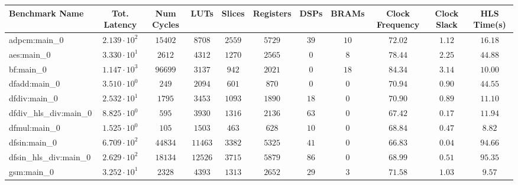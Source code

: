 \begin{tabular}{|l|c|c|c|c|c|c|c|c|c|c|}
\hline
Benchmark Name          & Tot. Latency           & Num Cycles & LUTs      & Slices    & Registers & DSPs    & BRAMs   & Clock Frequency & Clock Slack & HLS Time(s) \\
\hline
adpcm:main\_0           & $ 2.139 \cdot 10^{2} $ & $ 15402  $ & $ 8708  $ & $ 2559  $ & $ 5729  $ & $ 39  $ & $ 10  $ & $ 72.02       $ & $ 1.12    $ & $ 16.18   $ \\
aes:main\_0             & $ 3.330 \cdot 10^{1} $ & $ 2612   $ & $ 4312  $ & $ 1270  $ & $ 2565  $ & $ 0   $ & $ 8   $ & $ 78.44       $ & $ 2.25    $ & $ 44.88   $ \\
bf:main\_0              & $ 1.147 \cdot 10^{3} $ & $ 96699  $ & $ 3137  $ & $ 942   $ & $ 2021  $ & $ 0   $ & $ 18  $ & $ 84.34       $ & $ 3.14    $ & $ 10.00   $ \\
dfadd:main\_0           & $ 3.510 \cdot 10^{0} $ & $ 249    $ & $ 2094  $ & $ 601   $ & $ 870   $ & $ 0   $ & $ 0   $ & $ 70.94       $ & $ 0.90    $ & $ 44.55   $ \\
dfdiv:main\_0           & $ 2.532 \cdot 10^{1} $ & $ 1795   $ & $ 3453  $ & $ 1093  $ & $ 1890  $ & $ 18  $ & $ 0   $ & $ 70.90       $ & $ 0.89    $ & $ 11.10   $ \\
dfdiv\_hls\_div:main\_0 & $ 8.825 \cdot 10^{0} $ & $ 595    $ & $ 3930  $ & $ 1316  $ & $ 2136  $ & $ 63  $ & $ 0   $ & $ 67.42       $ & $ 0.17    $ & $ 11.94   $ \\
dfmul:main\_0           & $ 1.525 \cdot 10^{0} $ & $ 105    $ & $ 1503  $ & $ 463   $ & $ 628   $ & $ 10  $ & $ 0   $ & $ 68.84       $ & $ 0.47    $ & $ 8.82    $ \\
dfsin:main\_0           & $ 6.709 \cdot 10^{2} $ & $ 44834  $ & $ 11463 $ & $ 3382  $ & $ 5325  $ & $ 41  $ & $ 0   $ & $ 66.83       $ & $ 0.04    $ & $ 94.66   $ \\
dfsin\_hls\_div:main\_0 & $ 2.629 \cdot 10^{2} $ & $ 18134  $ & $ 12526 $ & $ 3715  $ & $ 5879  $ & $ 86  $ & $ 0   $ & $ 68.99       $ & $ 0.51    $ & $ 95.35   $ \\
gsm:main\_0             & $ 3.252 \cdot 10^{1} $ & $ 2328   $ & $ 4393  $ & $ 1313  $ & $ 2652  $ & $ 29  $ & $ 3   $ & $ 71.58       $ & $ 1.03    $ & $ 9.57    $ \\

\end{tabular}
